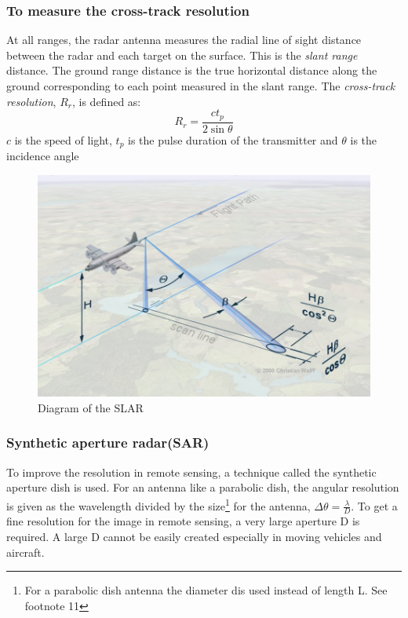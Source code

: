 \subsubsection{To measure the cross-track resolution}
At all ranges, the radar antenna measures the radial line of sight distance between the radar and each target on the surface. This is the \textit{slant range} distance. The ground range distance is the true horizontal distance along the ground corresponding to each point measured in the slant range. The \textit{cross-track resolution}, $R_{r}$, is defined as:  
\begin{dmath*}
R_{r}=\frac{ct_{p}}{2\sin\theta}
\end{dmath*}
$c$ is the speed of light, $t_{p}$ is the pulse duration of the transmitter and $\theta$ is the incidence angle
\begin{figure}[h]
\centering
\includegraphics[width=1\linewidth]{./graphics/fig 1.19(SLAR)}
\caption{Diagram of the SLAR}
\end{figure}

\subsubsection{Synthetic aperture radar(SAR)}
To improve the resolution in remote sensing, a technique called the synthetic aperture dish is used. For an antenna like a parabolic dish, the angular resolution is given as the wavelength divided by the size\footnote{For a parabolic dish antenna the diameter \textquotesingle d\textquotesingle is used instead of length \textquotesingle L\textquotesingle. See footnote 11} for the antenna, $\Delta \theta = \frac{\lambda}{D}$. To get a fine resolution for the image in remote sensing, a very large aperture D is required. A large D cannot be easily created especially in moving vehicles and aircraft.\\

